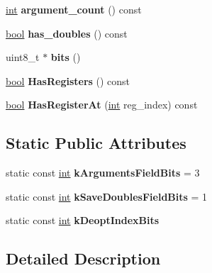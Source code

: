 \begin{DoxyCompactItemize}
\mbox{\hyperlink{classint}{int}} {\bfseries argument\+\_\+count} () const
\item 
\mbox{\label{classv8_1_1internal_1_1SafepointEntry_ab55cb818f8186cb1d35ee1358feae7a5}} 
\mbox{\hyperlink{classbool}{bool}} {\bfseries has\+\_\+doubles} () const
\item 
\mbox{\label{classv8_1_1internal_1_1SafepointEntry_afd78375bea1199e6be5da9c1dd12ba23}} 
uint8\+\_\+t $\ast$ {\bfseries bits} ()
\item 
\mbox{\label{classv8_1_1internal_1_1SafepointEntry_a679f13816afae0d510bc33ae04172374}} 
\mbox{\hyperlink{classbool}{bool}} {\bfseries Has\+Registers} () const
\item 
\mbox{\label{classv8_1_1internal_1_1SafepointEntry_af17ef394206619509b3b9da8c5cf180d}} 
\mbox{\hyperlink{classbool}{bool}} {\bfseries Has\+Register\+At} (\mbox{\hyperlink{classint}{int}} reg\+\_\+index) const
\end{DoxyCompactItemize}
\subsection*{Static Public Attributes}
\begin{DoxyCompactItemize}
\item 
\mbox{\label{classv8_1_1internal_1_1SafepointEntry_a31894265ea9ab2a0e102f114fc442fc0}} 
static const \mbox{\hyperlink{classint}{int}} {\bfseries k\+Arguments\+Field\+Bits} = 3
\item 
\mbox{\label{classv8_1_1internal_1_1SafepointEntry_a4108e18fe4bbc714ca298c135a34bbd7}} 
static const \mbox{\hyperlink{classint}{int}} {\bfseries k\+Save\+Doubles\+Field\+Bits} = 1
\item 
static const \mbox{\hyperlink{classint}{int}} {\bfseries k\+Deopt\+Index\+Bits}
\end{DoxyCompactItemize}


\subsection{Detailed Description}


